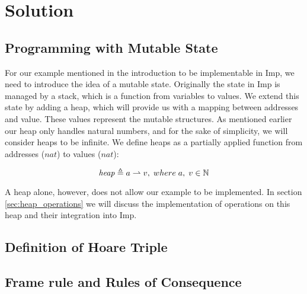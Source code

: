 \section{Solution}
\subsection{Programming with Mutable State}
\label{sec:programming_with_mutable_state}
For our example mentioned in the introduction to be implementable in Imp, we need to introduce the idea of a mutable state. Originally the state in Imp is managed by a stack, which is a function from variables to values. We extend this state by adding a heap, which will provide us with a mapping between addresses and value. These values represent the mutable structures. As mentioned earlier our heap only handles natural numbers, and for the sake of simplicity, we will consider heaps to be infinite. We define heaps as a partially applied function from addresses ($nat$) to values ($nat$):

\[
\mathit{heap} \mathrel{\triangleq} a\rightharpoonup v, \; where\; a, \;v \in \mathbb{N}
\] 

A heap alone, however, does not allow our example to be implemented. In section \ref{sec:heap_operations} we will discuss the implementation of operations on this heap and their integration into Imp. 



\subsection{Definition of Hoare Triple}


\subsection{Frame rule and Rules of Consequence}


